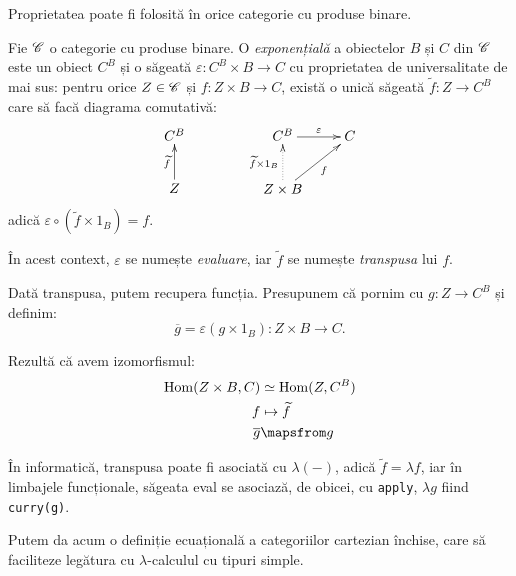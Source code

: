 \documentclass[a4paper]{article}
\begin{document}
Proprietatea poate fi folosită în orice categorie cu produse binare.

\begin{definition}\label{def:exp}
  Fie $ \mathscr{C} $ o categorie cu produse binare. O \emph{exponențială} a
  obiectelor $ B $ și $ C $ din $ \mathscr{C} $ este un obiect $ C^B $ și o
  săgeată $\varepsilon : C^B \times B \to C $ cu proprietatea de
  universalitate de mai sus: pentru orice $ Z \in \mathscr{C} $ și
  $ f : Z \times B \to C $, există o unică săgeată $ \widetilde f : Z \to C^B $
  care să facă diagrama comutativă:
  \[
    \xymatrix{
      C^B \\
      Z \ar[u]^-{\widetilde{f}}
    } \qquad\qquad
    \xymatrix{
    C^B \ar[r]^-\varepsilon & C \\
    Z \times B \ar@{.>}[u]^-{\widetilde{f} \times 1_B} \ar[ur]_-f &
  }
  \]
  adică $ \varepsilon \circ (\widetilde{f} \times 1_B) = f $.

  În acest context, $ \varepsilon $ se numește \emph{evaluare}, iar
  $ \widetilde{f} $ se numește \emph{transpusa} lui $ f $.
\end{definition}

Dată transpusa, putem recupera funcția. Presupunem că pornim cu $ g : Z \to C^B $
și definim:
\[
  \overline{g} = \varepsilon(g \times 1_B) : Z \times B \to C.
\]

Rezultă că avem izomorfismul:
\begin{align*}
  \dr{Hom}(Z \times B, C) &\simeq \dr{Hom}(Z, C^B) \\
  f &\mapsto \widetilde{f} \\
  \overline{g} &\mapsfrom g
\end{align*}

\begin{remark}\label{rk:eval}
  În informatică, transpusa poate fi asociată cu $ \lambda(-) $, adică
  $\widetilde{f} = \lambda f $, iar în limbajele funcționale, săgeata eval
  se asociază, de obicei, cu \texttt{apply}, $ \lambda g $ fiind \texttt{curry(g)}.
\end{remark}


Putem da acum o definiție ecuațională a categoriilor cartezian închise,
care să faciliteze legătura cu $ \lambda $-calculul cu tipuri simple.
\end{document}
